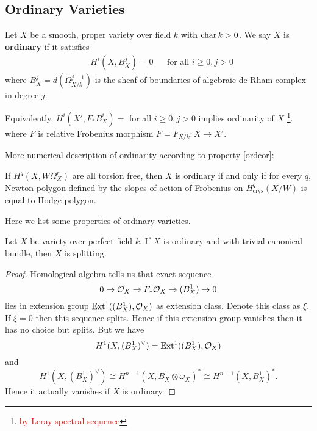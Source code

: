 \subsection{Ordinary Varieties}
\begin{secdefn}
Let $X$ be a smooth, proper variety over field $k$ with $\operatorname{char} k > 0$. We say $X$ is \textbf{ordinary} if it satisfies
\begin{align}
& &H^i(X,B_X^j)=0 & &\text{for all } i \geq 0, j > 0&
\end{align}
where $B^j_X = d(\Omega^{j-1}_{X/k})$ is the sheaf of boundaries of algebraic de Rham complex in degree $j$.
\end{secdefn}
Equivalently, $H^i(X',F_* B_X^i)=$ for all $i \geq 0,j>0$ implies  ordinarity of $X$ \footnote{\textcolor{red}{by Leray spectral sequence}}. where $F$ is relative Frobenius morphism $F=F_{X/k}: X \to X'$. 

More numerical description of ordinarity according to property \ref{ordcor}:

If $H^q(X,W\Omega_X^r)$ are all torsion free, then $X$ is ordinary if and only if for every $q$, Newton polygon defined by the slopes of action of Frobenius on $H^q_{\text{crys}}(X/W)$ is equal to Hodge polygon.

Here we list some properties of ordinary varieties.
\begin{secprop}
	Let $X$ be variety over perfect field $k$. If $X$ is ordinary and with trivial canonical bundle, then $X$ is splitting.
\end{secprop}
\begin{proof}
	Homological algebra tells us that exact sequence 
	\[
	0 \to \mathcal{O}_{X} \to F_* \mathcal{O}_{X} \to (B_X^1) \to 0
	\]
	lies in extension group $\operatorname{Ext}^1((B_X^1),\mathcal{O}_{X})$ as extension class. Denote this class as $\xi$. If $\xi =0$ then this sequence splits. Hence if this extension group vanishes then it has no choice but splits. But we have $$H^1(X,(B_X^1)^{\vee}) = \operatorname{Ext}^1((B_X^1),\mathcal{O}_{X})$$ and
	\[
	H^1(X,(B_X^1)^{\vee}) \cong H^{n-1}(X,B_X^1 \otimes \omega_X)^* \cong H^{n-1}(X, B_X^1)^*.
	\]Hence it actually vanishes if $X$ is ordinary.
\end{proof}

